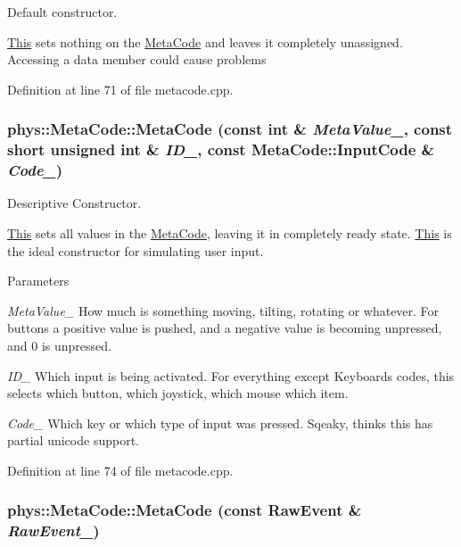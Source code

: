 Default constructor. 

\hyperlink{structThis}{This} sets nothing on the \hyperlink{classphys_1_1MetaCode}{MetaCode} and leaves it completely unassigned. Accessing a data member could cause problems 

Definition at line 71 of file metacode.cpp.

\hypertarget{classphys_1_1MetaCode_a05bcc50a09a9a5d19520dc258841f117}{
\subsubsection[{MetaCode}]{\setlength{\rightskip}{0pt plus 5cm}phys::MetaCode::MetaCode (const int \& {\em MetaValue\_\-}, \/  const short unsigned int \& {\em ID\_\-}, \/  const {\bf MetaCode::InputCode} \& {\em Code\_\-})}}
\label{da/dc9/classphys_1_1MetaCode_a05bcc50a09a9a5d19520dc258841f117}


Descriptive Constructor. 

\hyperlink{structThis}{This} sets all values in the \hyperlink{classphys_1_1MetaCode}{MetaCode}, leaving it in completely ready state. \hyperlink{structThis}{This} is the ideal constructor for simulating user input. 
\begin{DoxyParams}{Parameters}
\item[{\em MetaValue\_\-}]How much is something moving, tilting, rotating or whatever. For buttons a positive value is pushed, and a negative value is becoming unpressed, and 0 is unpressed. \item[{\em ID\_\-}]Which input is being activated. For everything except Keyboards codes, this selects which button, which joystick, which mouse which item. \item[{\em Code\_\-}]Which key or which type of input was pressed. Sqeaky, thinks this has partial unicode support. \end{DoxyParams}


Definition at line 74 of file metacode.cpp.

\hypertarget{classphys_1_1MetaCode_ad9a618b5cc6f9d0cf0a4bc4f47bf98e8}{
\subsubsection[{MetaCode}]{\setlength{\rightskip}{0pt plus 5cm}phys::MetaCode::MetaCode (const {\bf RawEvent} \& {\em RawEvent\_\-})}}
\label{da/dc9/classphys_1_1MetaCode_ad9a618b5cc6f9d0cf0a4bc4f47bf98e8}


